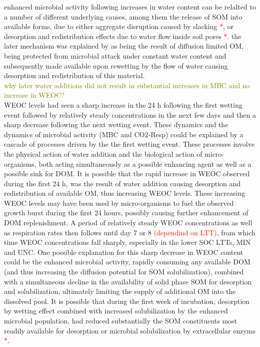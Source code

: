 \documentclass[12pt]{report}
\newcommand{\myRed}[1]{\textcolor{red}{#1}} %
\newcommand{\myGreen}[1]{\textcolor{olive}{#1}} %
\begin{document}
		enhanced microbial activity following increases in water content can be relalted to a number of different underlying causes, among them the release of SOM into available forms, due to either aggregate disruption caused by slacking \myRed{*},  or desorption and redistribution effects due to water flow inside soil pores \citep{xiang2008} \myRed{*}. the later mechanism was explained by \citeauthor{Xiang2008} as being the result of diffusion limited OM, being protected from microbial attack under constant water content and subsequently made available upon rewetting by the flow of water causing desorption and redistribution of this material. \\
		\myGreen{why later water additions did not result in substantial increases in MBC and no increase in WEOC?}\\
		WEOC levels had seen a sharp increase in the 24 h following the first wetting event followed by relatively steady concentrations in the next few days and then a sharp decrease following the next wetting event. 
		These  dynamics and the dynamics of microbial activity (MBC and CO2-Resp) could be explained by a cascade of processes driven by the the first wetting event. These processes involve the physical action of water addition and the biological action of micro-organisms, both acting simultaneously as a possible enhancing agent as well as a possible sink for DOM. It is possible that the rapid increase in WEOC observed during the first 24 h, was the result of water addition causing desorption and redistribution of available OM, thus increasing WEOC levels. These increasing WEOC levels may have been used by micro-organisms to fuel the observed growth burst during the first 24 hours, possibly causing further enhancement of DOM replenishment.  A period of relatively steady WEOC concentrations as well as respiration rates then follows until day 7 or 8 \myRed{(dependind on LTT)}, from which time WEOC concentrations fall sharply, especially in the lower SOC LTTs, MIN and UNC. 
		One possible explanation for this sharp decrease in WEOC content could be the enhanced microbial activity, rapidly consuming any available DOM (and thus increasing the diffusion potential for SOM solubilization), combined with a simultaneous decline in the availability of solid phase SOM for desorption and solubilization, ultimately limiting the supply of additional OM into the dissolved pool.
		It is possible that during the first week of incubation, desorption by wetting effect combined with increased solubilization by the enhanced microbial population, had reduced substantially the SOM constituents  most readily available for desorption or microbial solubilization by extracellular enzyms \myRed{*}. \\
\end{document}
